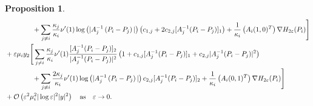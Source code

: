 \documentclass[11pt,reqno,a4paper]{amsart}
\numberwithin{equation}{section}
\newcommand{\ve}{\varepsilon}
\newtheorem{prop}{Proposition}[section]
\begin{document}
\begin{prop}
\begin{equation}
\begin{aligned}
&\hspace{14mm}+\sum_{j\neq i}\frac{\kappa_j}{\kappa_{i}}\nu'(1)\log\left(|A_j^{-1}\left(P_i-P_j\right)|\right)\left(c_{1,j}+2c_{2,j}[A_j^{-1}(P_i-P_j)]_1\right)+\frac{1}{\kappa_i}\left(A_{i}(1,0)^{T}\right)\nabla H_{2\ve}(P_i)\Bigg]\\
&+\ve \mu_i y_2 \Bigg[\sum_{j \neq i}\frac{\kappa_j}{\kappa_i}\nu'(1)\frac{[A_j^{-1}(P_i-P_j)]_{2}}{|A_j^{-1}(P_i-P_j)|^2}\left(1+c_{1,j}[A_j^{-1}(P_i-P_j)]_{1}+c_{2,j}|A_j^{-1}(P_i-P_j)|^2\right)\\
&\hspace{14mm}+\sum_{j\neq i}\frac{2\kappa_j}{\kappa_{i}}\nu'(1)\log\left(|A_j^{-1}\left(P_i-P_j\right)|\right)c_{2,j}[A_j^{-1}(P_i-P_j)]_2+\frac{1}{\kappa_i}\left(A_i(0,1)^{T}\right)\nabla H_{2\ve}(P_i)\Bigg]\\
&+\mathcal{O}\left(\ve^2 \mu_i ^2 |\log\ve|^2 |y|^2 \right) \quad \mbox{as} \quad \ve \to 0.
\end{aligned}
\end{equation} 
\end{prop}
\end{document}
